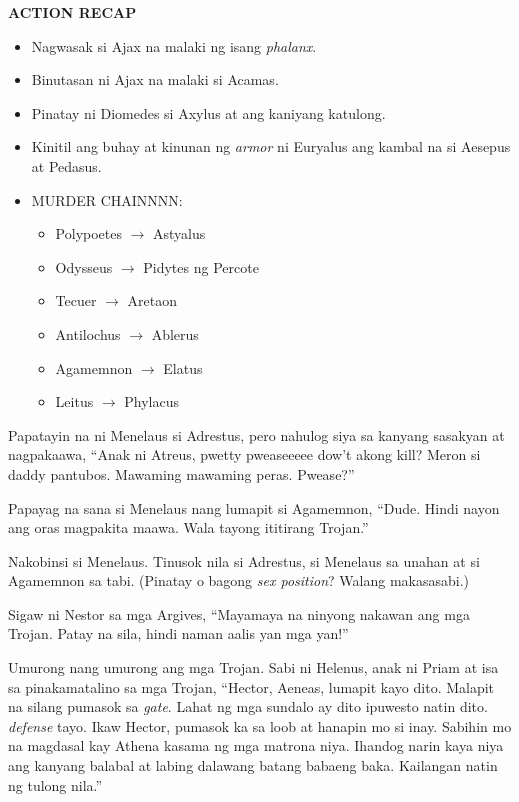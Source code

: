 \documentclass[12pt,letterpaper]{report}
\newenvironment{recap}{\begin{samepage}\begin{center}{\large\textbf{ACTION RECAP}}\begin{itemize}}{\end{itemize}\end{center}\end{samepage}}
\newcommand{\killchain}[2]{#1 $\rightarrow$ #2}
\begin{document}
\begin{recap}
    \item Nagwasak si Ajax na malaki ng isang \textit{phalanx}.
    \item Binutasan ni Ajax na malaki si Acamas.
    \item Pinatay ni Diomedes si Axylus at ang kaniyang katulong.
    \item Kinitil ang buhay at kinunan ng \textit{armor} ni Euryalus ang kambal na si Aesepus at Pedasus.
    \item MURDER CHAINNNN:
    \begin{itemize}
        \item \killchain{Polypoetes}{Astyalus}
        \item \killchain{Odysseus}{Pidytes ng Percote}
        \item \killchain{Tecuer}{Aretaon}
        \item \killchain{Antilochus}{Ablerus}
        \item \killchain{Agamemnon}{Elatus}
        \item \killchain{Leitus}{Phylacus}
    \end{itemize}
\end{recap}

Papatayin na ni Menelaus si Adrestus, pero nahulog siya sa kanyang sasakyan at nagpakaawa, ``Anak ni Atreus, pwetty pweaseeeee dow't akong kill? Meron si daddy pantubos. Mawaming mawaming peras. Pwease?''

Papayag na sana si Menelaus nang lumapit si Agamemnon, ``Dude. Hindi nayon ang oras magpakita maawa. Wala tayong  ititirang Trojan.''

Nakobinsi si Menelaus. Tinusok nila si Adrestus, si Menelaus sa unahan at si Agamemnon sa tabi. (Pinatay o bagong \textit{sex position}? Walang makasasabi.)

Sigaw ni Nestor sa mga Argives, ``Mayamaya na ninyong nakawan ang mga Trojan. Patay na sila, hindi naman aalis yan mga yan!''

Umurong nang umurong ang mga Trojan. Sabi ni Helenus, anak ni Priam at isa sa pinakamatalino sa mga Trojan, ``Hector, Aeneas, lumapit kayo dito. Malapit na silang pumasok sa \textit{gate}. Lahat ng mga sundalo ay dito ipuwesto natin dito. \textit{defense} tayo. Ikaw Hector, pumasok ka sa loob at hanapin mo si inay. Sabihin mo na magdasal kay Athena kasama ng mga matrona niya. Ihandog narin kaya niya ang kanyang balabal at labing dalawang batang babaeng baka. Kailangan natin ng tulong nila.''
\end{document}

